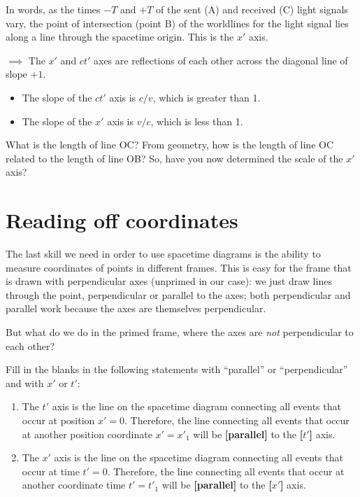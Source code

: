 \documentclass[11pt, letterpaper, openany]{book}
\newenvironment{exercise}[1][Exercise]{%
  \tcolorbox[blanker, breakable, left=1em,
    before skip=1em, after skip=1em,
    borderline west={3pt}{0pt}{PhysNavy},
    colback=PhysCream,
    before upper={\textcolor{PhysNavy}{\sffamily\bfseries #1:}\space}
  ]%
}{%
  \endtcolorbox%
}
\begin{document}
In words, as the times $-T$ and $+T$ of the sent (A) and received (C) light signals vary, the point of intersection (point B) of the worldlines for the light signal lies along a line through the spacetime origin. This is the $x'$ axis.

$\implies$ The $x'$ and $ct'$ axes are reflections of each other across the diagonal line of slope $+1$.
\begin{itemize}
    \item The slope of the $ct'$ axis is $c/v$, which is greater than 1.
    \item The slope of the $x'$ axis is $v/c$, which is less than 1.
\end{itemize}

\begin{exercise}[Exercise 8]
What is the length of line OC? From geometry, how is the length of line OC related to the length of line OB? So, have you now determined the scale of the $x'$ axis?
\end{exercise}

\section{Reading off coordinates}

The last skill we need in order to use spacetime diagrams is the ability to measure coordinates of points in different frames. This is easy for the frame that is drawn with perpendicular axes (unprimed in our case): we just draw lines through the point, perpendicular or parallel to the axes; both perpendicular and parallel work because the axes are themselves perpendicular.

But what do we do in the primed frame, where the axes are \textit{not} perpendicular to each other?

\begin{exercise}[Exercise 9]
Fill in the blanks in the following statements with ``parallel'' or ``perpendicular'' and with $x'$ or $t'$:
\begin{enumerate}[label=(\alph*)]
    \item The $t'$ axis is the line on the spacetime diagram connecting all events that occur at position $x'=0$. Therefore, the line connecting all events that occur at another position coordinate $x' = x'_1$ will be \textbf{[parallel]} to the \textbf{[$t'$]} axis.
    \item The $x'$ axis is the line on the spacetime diagram connecting all events that occur at time $t'=0$. Therefore, the line connecting all events that occur at another coordinate time $t' = t'_1$ will be \textbf{[parallel]} to the \textbf{[$x'$]} axis.
\end{enumerate}
\end{exercise}
\end{document}
